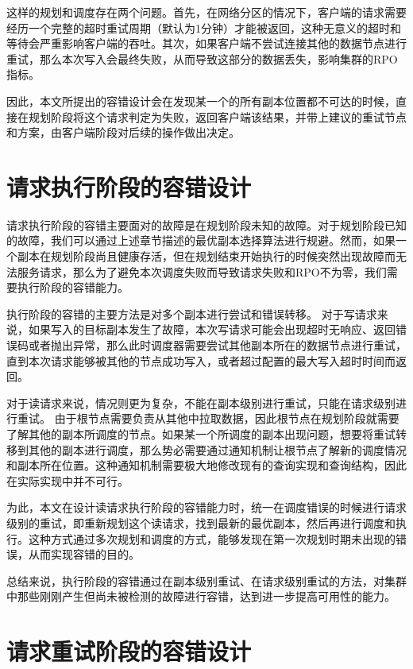这样的规划和调度存在两个问题。首先，在网络分区的情况下，客户端的请求需要经历一个完整的超时重试周期（默认为1分钟）才能被返回，这种无意义的超时和等待会严重影响客户端的吞吐。其次，如果客户端不尝试连接其他的数据节点进行重试，那么本次写入会最终失败，从而导致这部分的数据丢失，影响集群的RPO指标。

因此，本文所提出的容错设计会在发现某一个\fragmentinstance 的所有副本位置都不可达的时候，直接在规划阶段将这个请求判定为失败，返回客户端该结果，并带上建议的重试节点和方案，由客户端阶段对后续的操作做出决定。


\section{请求执行阶段的容错设计}\label{sec:failover-schedule}


请求执行阶段的容错主要面对的故障是在规划阶段未知的故障。对于规划阶段已知的故障，我们可以通过上述章节描述的最优副本选择算法进行规避。然而，如果一个副本在规划阶段尚且健康存活，但在规划结束开始执行的时候突然出现故障而无法服务请求，那么为了避免本次调度失败而导致请求失败和RPO不为零，我们需要执行阶段的容错能力。

执行阶段的容错的主要方法是对多个副本进行尝试和错误转移。
对于写请求来说，如果写入的目标副本发生了故障，本次写请求可能会出现超时无响应、返回错误码或者抛出异常，那么此时调度器需要尝试其他副本所在的数据节点进行重试，直到本次请求能够被其他的节点成功写入，或者超过配置的最大写入超时时间而返回。

对于读请求来说，情况则更为复杂，不能在副本级别进行重试，只能在请求级别进行重试。
由于根节点\fragmentinstance 需要负责从其他\fragmentinstance 中拉取数据，因此根节点在规划阶段就需要了解其他\fragmentinstance 的副本所调度的节点。如果某一个\fragmentinstance 所调度的副本出现问题，想要将重试转移到其他的副本进行调度，那么势必需要通过通知机制让根节点\fragmentinstance 了解新的调度情况和副本所在位置。这种通知机制需要极大地修改现有的查询实现和查询结构，因此在实际实现中并不可行。

为此，本文在设计读请求执行阶段的容错能力时，统一在调度错误的时候进行请求级别的重试，即重新规划这个读请求，找到最新的最优副本，然后再进行调度和执行。这种方式通过多次规划和调度的方式，能够发现在第一次规划时期未出现的错误，从而实现容错的目的。

总结来说，执行阶段的容错通过在副本级别重试、在请求级别重试的方法，对集群中那些刚刚产生但尚未被检测的故障进行容错，达到进一步提高可用性的能力。

\section{请求重试阶段的容错设计}

